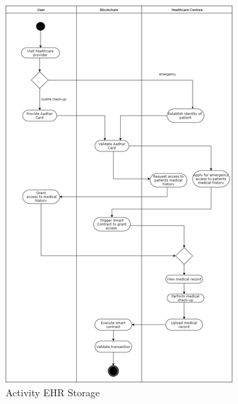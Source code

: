 \begin{figure}
	\centering
	\includegraphics[width=.8\linewidth]{Images/UML/ActivityEHRStorage.png}
	\caption{ Activity EHR Storage}
\end{figure}
